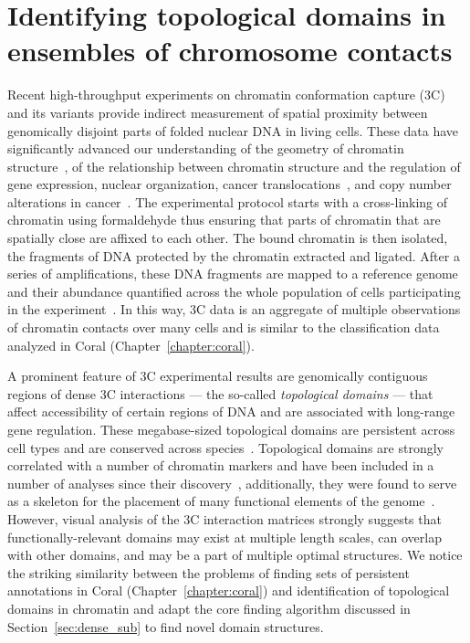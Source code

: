 \documentclass[12pt]{cmuthesis}
\begin{document}
\chapter{Identifying topological domains in ensembles of chromosome contacts}
\label{chapter:domains}


Recent high-throughput experiments on chromatin conformation capture (3C) and its variants provide indirect measurement of spatial proximity between genomically disjoint parts of folded nuclear DNA in living cells. These data have significantly advanced our understanding of the geometry of chromatin structure~\cite{Gibcus2013}, of the relationship between chromatin structure and the regulation of gene expression, nuclear organization, cancer translocations~\cite{Cavalli2013}, and copy number alterations in cancer~\cite{Fudenberg2011}. The experimental protocol starts with a cross-linking of chromatin using formaldehyde thus ensuring that parts of chromatin that are spatially close are affixed to each other. The bound chromatin is then isolated, the fragments of DNA protected by the chromatin extracted and ligated. After a series of amplifications, these DNA fragments are mapped to a reference genome and their abundance quantified across the whole population of cells participating in the experiment~\cite{Dekker3c}. In this way, 3C data is an aggregate of multiple observations of chromatin contacts over many cells and is similar to the classification data analyzed in Coral (Chapter~\ref{chapter:coral}). 

A prominent feature of 3C experimental results are genomically contiguous regions of dense 3C interactions --- the so-called \textit{topological domains} --- that affect accessibility of certain regions of DNA and are associated with long-range gene regulation. These megabase-sized topological domains are persistent across cell types and are conserved across species~\cite{Dixon2012}. Topological domains are strongly correlated with a number of chromatin markers and have been included in a number of analyses since their discovery~\cite{Hou2012,Kolbl2012,Lin2012}, additionally, they were found to serve as a skeleton for the placement of many functional elements of the genome~\cite{Bickmore2013a,Tanay2013}. However, visual analysis of the 3C interaction matrices strongly suggests that functionally-relevant domains may exist at multiple length scales, can overlap with other domains, and may be a part of multiple optimal structures. We notice the striking similarity between the problems of finding sets of persistent annotations in Coral (Chapter~\ref{chapter:coral}) and identification of topological domains in chromatin and adapt the core finding algorithm discussed in Section~\ref{sec:dense_sub} to find novel domain structures.
\end{document}
